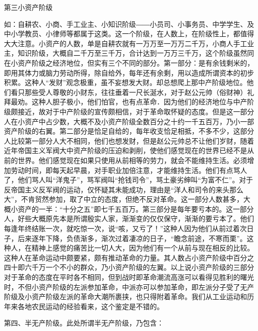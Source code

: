 第三小资产阶级

如：自耕农、小商、手工业主、小知识阶级――小员司、小事务员、中学学生、及中小学教员、小律师等都属于这类。这一个阶级，在人数上，在阶级性上，都值得大大注意。小资产的人数，单是自耕农就有一万万至一万万二千万，小商人手工业主，知识阶级，大概自二千万至三千万，合计达到一万万三千万，这个阶级虽然同在小资产阶级之经济地位，但实有三个不同的部分。第一部分：是有余钱剩米的，即用其体力或脑力劳动所得，除自给外，每年还有余剩，用以造成所谓资本的初步积累。这种人“发财”观念极重，虽不妄想发大财。却总想爬上那中产阶级地位。他们看只那些受人尊敬的小财东，往往垂着一尺长涎水，对于赵公元帅（俗财神）礼拜最劝。这种人胆子极小，他们怕官，也有点革命．因为他们的经济地位与中产阶级颇接近，故对于中产阶级的宣传颇相信，对于革命取怀疑的态度。但是这一部分人在小资产中占少数，大概不及小资产阶级全数百分之十约一千五百万，乃小一部资产阶级的右翼。第二部分是恰足自给的，每年收支恰足相抵，不多不少，这部分人比较第一部分人大不相同，他们也想发财，但是赵公元帅总不让他们岁财，随着近年帝国主义军阀大中资产阶级的压迫和剥削，使他们感觉现在的世界已经不是从前的世界。他们感觉现在如果只使用从前相等的劳力，就会不能维持生活。必须增加劳动时间，即每天起早晨，对手职业加倍注意，才能维持生活。他们有点骂人了，他们骂人叫“洋鬼子”，骂军阀叫“抢钱司令”，骂土豪劣绅叫“为富不仁”。对于反帝国主义反军阀的运动，仅怀疑其未能成功，理由是“洋人和司令的来头那么大”，不肯贸然参加，取了中立的态度，但绝不反对革命。这一部分人数甚多，大概小资产的一半：“十分之五”即七千五百万。第三部分是每年要亏本的。这一部分人，好些大概原先本是所谓殷实人家，渐渐变的仅仅保守，渐渐的要亏本了。他们每逢年终结账一次，就吃惊一次，说“咳，又亏了！”这种人因为他们从前过着次日子，后来逐年下降，负债渐多，渐次过着凄凉的日子，“瞻念前途，不寒而栗”。这种人，在精神上感觉的痛苦比一切人大，因为他们有一个从前与现在相反的比较。这种人在革命运动中颇要紧，颇有推动革命的力量。其人数占小资产阶级中百分之四十即六千万一个不小的群众，乃小资产阶级的左翼。以上说小资产阶级的三部分对于革命的态度在平时各不相同，但到战时即革命潮流高涨可以看得见胜利的曙光时，不但小资产阶级的左派参加革命，中派亦可以参加革命，即左派分子受了无产阶级及小资产阶级左派的革命大潮所裹挟，也只得附着革命。我们从工业运动和历年来各地农民运动的经验看来，这个鉴定是不错的。

第四、半无产阶级。此处所谓半无产阶级，乃包含：

